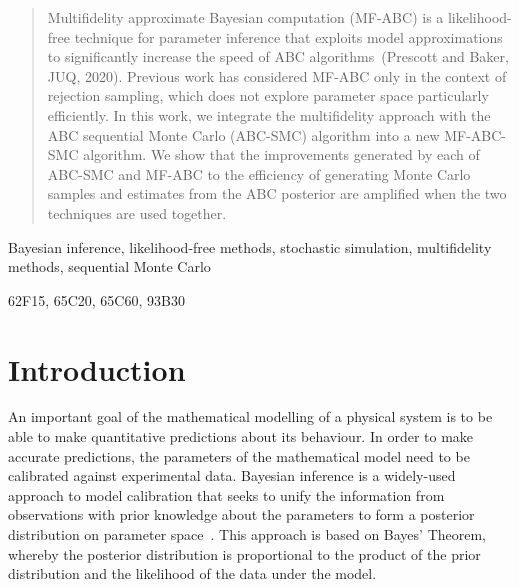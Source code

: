 \documentclass[review]{siamonline190516}
\begin{document}
\maketitle{}

\begin{abstract}
Multifidelity approximate Bayesian computation (MF-ABC) is a likelihood-free technique for parameter inference that exploits model approximations to significantly increase the speed of ABC algorithms~(Prescott and Baker, JUQ, 2020).
Previous work has considered MF-ABC only in the context of rejection sampling, which does not explore parameter space particularly efficiently.
In this work, we integrate the multifidelity approach with the ABC sequential Monte Carlo (ABC-SMC) algorithm into a new MF-ABC-SMC algorithm.
We show that the improvements generated by each of ABC-SMC and MF-ABC to the efficiency of generating Monte Carlo samples and estimates from the ABC posterior are amplified when the two techniques are used together.
\end{abstract}

\begin{keywords}
Bayesian inference, likelihood-free methods, stochastic simulation, multifidelity methods, sequential Monte Carlo
\end{keywords}

\begin{AMS}
62F15, 65C20, 65C60, 93B30
\end{AMS}

\section{Introduction}
\label{s:Intro}

An important goal of the mathematical modelling of a physical system is to be able to make quantitative predictions about its behaviour.
In order to make accurate predictions, the parameters of the mathematical model need to be calibrated against experimental data.
Bayesian inference is a widely-used approach to model calibration that seeks to unify the information from observations with prior knowledge about the parameters to form a posterior distribution on parameter space~\cite{Beaumont2010,Hines2015,Schnoerr2017}.
This approach is based on Bayes' Theorem, whereby the posterior distribution is proportional to the product of the prior distribution and the likelihood of the data under the model.
\end{document}
